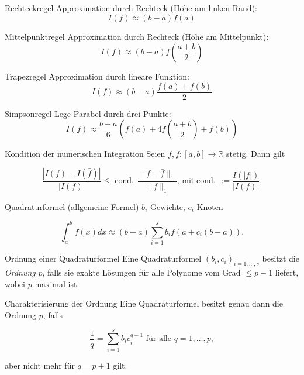 
\begin{flashcard}[Definition]{Rechteckregel}
Approximation durch Rechteck (Höhe am linken Rand):
$$ I(f) \approx (b - a) f(a) $$
\end{flashcard}

\begin{flashcard}[Definition]{Mittelpunktregel}
Approximation durch Rechteck (Höhe am Mittelpunkt):
$$ I(f) \approx (b - a) f\left(\frac{a + b}{2}\right) $$
\end{flashcard}

\begin{flashcard}[Definition]{Trapezregel}
Approximation durch lineare Funktion:
$$ I(f) \approx (b - a) \frac{f(a) + f(b)}{2} $$
\end{flashcard}

\begin{flashcard}[Definition]{Simpsonregel}
Lege Parabel durch drei Punkte:
$$ I(f) \approx \frac{b-a}{6} \left( f(a) + 4 f\left(\frac{a+b}{2}\right) + f(b) \right) $$
\end{flashcard}

\begin{flashcard}[Ungleichung]{Kondition der numerischen Integration}
Seien $\bar{f}, f : [a, b] \rightarrow \mathbb{R}$ stetig. Dann gilt

$$ \frac{|I(f) - I(\bar{f})|}{|I(f)|} \leq \operatorname{cond}_1 \frac{\|f-\bar{f}\|_1}{\|f\|_1}, \, \text{mit} \operatorname{cond}_1 := \frac{I(|f|)}{|I(f)|}.$$
\end{flashcard}

\begin{flashcard}[Definition]{Quadraturformel (allgemeine Formel)}
$b_i$ Gewichte, $c_i$ Knoten

$$ \int_a^b f(x) dx \approx (b - a) \sum_{i=1}^{s} b_i f(a + c_i (b - a)). $$
\end{flashcard}

\begin{flashcard}[Definition]{Ordnung einer Quadraturformel}
	Eine Quadraturformel $(b_i, c_i)_{i=1,\ldots,s}$ besitzt die \emph{Ordnung} $p$, falls sie exakte Lösungen für alle Polynome vom Grad $\leq p - 1$ liefert, wobei $p$ maximal ist.
\end{flashcard}

\begin{flashcard}[Satz]{Charakterisierung der Ordnung}
Eine Quadraturformel besitzt genau dann die Ordnung $p$, falls

$$ \frac{1}{q} = \sum_{i=1}^s b_i c_i^{q-1} \text{ für alle } q = 1, \ldots, p,$$

aber nicht mehr für $ q = p + 1$ gilt.
\end{flashcard}

